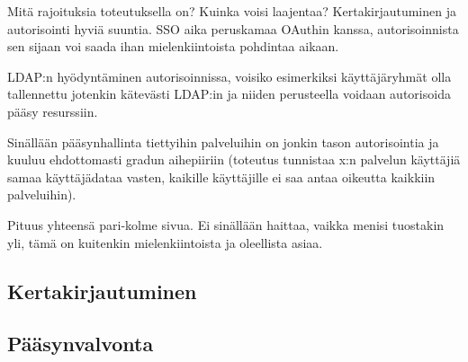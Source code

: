 Mitä rajoituksia toteutuksella on? Kuinka voisi laajentaa? Kertakirjautuminen ja autorisointi hyviä suuntia. SSO aika peruskamaa OAuthin kanssa, autorisoinnista sen sijaan voi saada ihan mielenkiintoista pohdintaa aikaan.

LDAP:n hyödyntäminen autorisoinnissa, voisiko esimerkiksi käyttäjäryhmät olla tallennettu jotenkin kätevästi LDAP:in ja niiden perusteella voidaan autorisoida pääsy resurssiin.

Sinällään pääsynhallinta tiettyihin palveluihin on jonkin tason autorisointia ja kuuluu ehdottomasti gradun aihepiiriin (toteutus tunnistaa x:n palvelun käyttäjiä samaa käyttäjädataa vasten, kaikille käyttäjille ei saa antaa oikeutta kaikkiin palveluihin).

Pituus yhteensä pari-kolme sivua. Ei sinällään haittaa, vaikka menisi tuostakin yli, tämä on kuitenkin mielenkiintoista ja oleellista asiaa.


\subsection{Kertakirjautuminen}

\subsection{Pääsynvalvonta}

